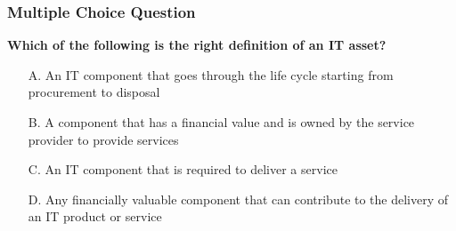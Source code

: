 \documentclass[aspectratio=169, table]{beamer}
\begin{document}
\begin{frame}
	\frametitle{Multiple Choice Question}
	\textbf{Which of the following is the right definition of an IT asset?}
	\begin{itemize}
		\item[A.] An IT component that goes through the life cycle starting from procurement to disposal
		\item[B.] A component that has a financial value and is owned by the service provider to provide services
		\item[C.] An IT component that is required to deliver a service
		\item[D.] Any financially valuable component that can contribute to the delivery of an IT product or service
	\end{itemize}
\end{frame}
\end{document}
